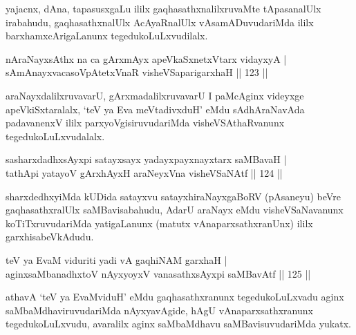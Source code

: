\begin{artha}
yajacnx, dAna, tapasusxgaLu ililx gaqhasathxnalilxruvaMte tApasanalUlx
irabahudu, gaqhasathxnalUlx AcAyaRnalUlx vAsamADuvudariMda ililx
barxhamxcArigaLanunx tegedukoLuLxvudilalx.
\end{artha}

\begin{shl}
nAraNayxsAthx na ca gArxmAyx apeVkaSxnetxV\s tarx vidayxyA | \\
sAmAnayxvacasoVpAtetxVnaR visheVSaparigarxhaH \hfill|| 123 || 
\end{shl}

\begin{artha}
araNayxdalilxruvavarU, gArxmadalilxruvavarU I paMcAginx videyxge
apeVkiSxtaralalx, `teV ya Eva meVtadivxduH' eMdu sAdhAraNavAda
padavanenxV ililx parxyoVgisiruvudariMda visheVSAthaRvanunx
tegedukoLuLxvudalalx.
\end{artha}


\begin{shl}
sasharxdadhxsAyxpi satayxsayx yadayxpayxnayxtarx saMBavaH | \\
tathA\s pi yatayoV gArxhAyxH araNeyxVna visheVSaNAtf \hfill|| 124 || 
\end{shl}

\begin{artha}
sharxdedhxyiMda kUDida satayxvu satayxhiraNayxgaBoRV (pAsaneyu) beVre
gaqhasathxralUlx saMBavisabahudu, AdarU araNayx eMdu visheVSaNavanunx
koTiTxruvudariMda yatigaLanunx (matutx vAnaparxsathxranUnx) ililx
garxhisabeVkAdudu.
\end{artha}


\begin{shl}
teV ya EvaM viduriti yadi vA gaqhiNAM garxhaH | \\
aginxsaMbanadhxtoV nAyxyoyxV vanasathxsAyxpi saMBavAtf \hfill|| 125 || 
\end{shl}

\begin{artha}
athavA `teV ya EvaMviduH' eMdu gaqhasathxranunx tegedukoLuLxvadu aginx
saMbaMdhaviruvudariMda nAyxyavAgide, hAgU vAnaparxsathxranunx
tegedukoLuLxvudu, avaralilx aginx saMbaMdhavu saMBavisuvudariMda
yukatx.
\end{artha}

